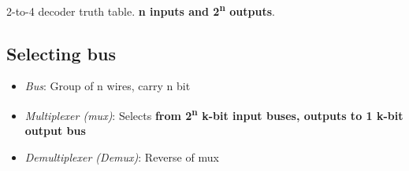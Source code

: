 \documentclass[11pt]{article}
\begin{document}
2-to-4 decoder truth table. \textbf{n inputs and 2\textsuperscript{n} outputs}.

\subsection{Selecting bus}
\label{sec:orga7b8fd4}

\begin{itemize}
\item \emph{Bus}: Group of n wires, carry n bit
\item \emph{Multiplexer (mux)}: Selects \textbf{from 2\textsuperscript{n} k-bit input buses, outputs to 1 k-bit output bus}
\item \emph{Demultiplexer (Demux)}: Reverse of mux
\end{itemize}
\end{document}
